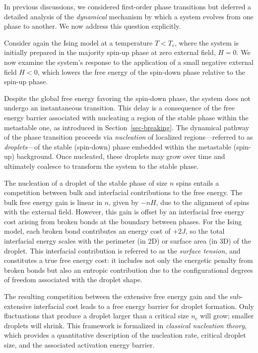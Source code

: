 \documentclass[
  letterpaper,
  enabledeprecatedfontcommands]{report}
\begin{document}
In previous discussions, we considered first-order phase transitions but
deferred a detailed analysis of the \emph{dynamical} mechanism by which
a system evolves from one phase to another. We now address this question
explicitly.

Consider again the Ising model at a temperature \(T < T_c\), where the
system is initially prepared in the majority spin-up phase at zero
external field, \(H = 0\). We now examine the system's response to the
application of a small negative external field \(H < 0\), which lowers
the free energy of the spin-down phase relative to the spin-up phase.

Despite the global free energy favoring the spin-down phase, the system
does not undergo an instantaneous transition. This delay is a
consequence of the free energy barrier associated with nucleating a
region of the stable phase within the metastable one, as introduced in
Section~\ref{sec-breaking}. The dynamical pathway of the phase
transition proceeds via \emph{nucleation} of localized
regions---referred to as \emph{droplets}---of the stable (spin-down)
phase embedded within the metastable (spin-up) background. Once
nucleated, these droplets may grow over time and ultimately coalesce to
transform the system to the stable phase.

The nucleation of a droplet of the stable phase of size \(n\) spins
entails a competition between bulk and interfacial contributions to the
free energy. The bulk free energy gain is linear in \(n\), given by
\(-nH\), due to the alignment of spins with the external field. However,
this gain is offset by an interfacial free energy cost arising from
broken bonds at the boundary between phases. For the Ising model, each
broken bond contributes an energy cost of \(+2J\), so the total
interfacial energy scales with the perimeter (in 2D) or surface area (in
3D) of the droplet. This interfacial contribution is referred to as the
\emph{surface tension}, and constitutes a true free energy cost: it
includes not only the energetic penalty from broken bonds but also an
entropic contribution due to the configurational degrees of freedom
associated with the droplet shape.

The resulting competition between the extensive free energy gain and the
sub-extensive interfacial cost leads to a free energy barrier for
droplet formation. Only fluctuations that produce a droplet larger than
a critical size \(n_c\) will grow; smaller droplets will shrink. This
framework is formalized in \emph{classical nucleation theory}, which
provides a quantitative description of the nucleation rate, critical
droplet size, and the associated activation energy barrier.
\end{document}
